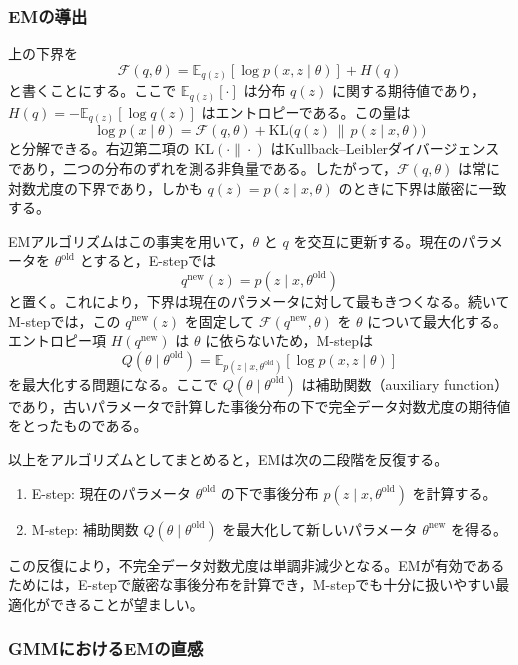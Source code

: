 \subsubsection{EMの導出}

上の下界を
\[
\mathcal{F}(q,\theta)
=
\mathbb{E}_{q(z)}[\log p(x,z \mid \theta)] + H(q)
\]
と書くことにする。ここで \(\mathbb{E}_{q(z)}[\cdot]\) は分布 \(q(z)\) に関する期待値であり，\(H(q)=-\mathbb{E}_{q(z)}[\log q(z)]\) はエントロピーである。この量は
\[
\log p(x \mid \theta)
=
\mathcal{F}(q,\theta)
+
\mathrm{KL}\bigl(q(z)\,\|\,p(z \mid x,\theta)\bigr)
\]
と分解できる。右辺第二項の \(\mathrm{KL}(\cdot\|\cdot)\) はKullback--Leiblerダイバージェンスであり，二つの分布のずれを測る非負量である。したがって，\(\mathcal{F}(q,\theta)\) は常に対数尤度の下界であり，しかも \(q(z)=p(z \mid x,\theta)\) のときに下界は厳密に一致する。

EMアルゴリズムはこの事実を用いて，\(\theta\) と \(q\) を交互に更新する。現在のパラメータを \(\theta^{\text{old}}\) とすると，E-stepでは
\[
q^{\text{new}}(z)=p(z \mid x,\theta^{\text{old}})
\]
と置く。これにより，下界は現在のパラメータに対して最もきつくなる。続いてM-stepでは，この \(q^{\text{new}}(z)\) を固定して \(\mathcal{F}(q^{\text{new}},\theta)\) を \(\theta\) について最大化する。エントロピー項 \(H(q^{\text{new}})\) は \(\theta\) に依らないため，M-stepは
\[
Q(\theta \mid \theta^{\text{old}})
=
\mathbb{E}_{p(z \mid x,\theta^{\text{old}})}[\log p(x,z \mid \theta)]
\]
を最大化する問題になる。ここで \(Q(\theta \mid \theta^{\text{old}})\) は補助関数（auxiliary function）であり，古いパラメータで計算した事後分布の下で完全データ対数尤度の期待値をとったものである。

以上をアルゴリズムとしてまとめると，EMは次の二段階を反復する。
\begin{enumerate}
\item E-step: 現在のパラメータ \(\theta^{\text{old}}\) の下で事後分布 \(p(z \mid x,\theta^{\text{old}})\) を計算する。
\item M-step: 補助関数 \(Q(\theta \mid \theta^{\text{old}})\) を最大化して新しいパラメータ \(\theta^{\text{new}}\) を得る。
\end{enumerate}
この反復により，不完全データ対数尤度は単調非減少となる。EMが有効であるためには，E-stepで厳密な事後分布を計算でき，M-stepでも十分に扱いやすい最適化ができることが望ましい。

\subsubsection{GMMにおけるEMの直感}

